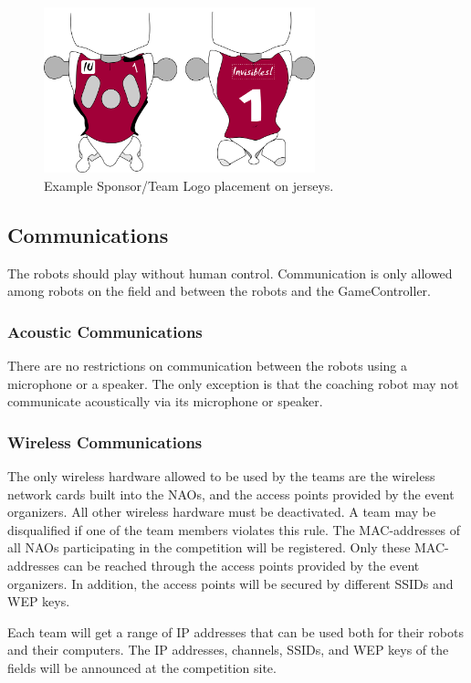 \documentclass[12pt]{article}
\begin{document}
\begin{figure}
\centerline{
\includegraphics[width=0.7\textwidth]{figs/jersey-logo.pdf}}
\caption{Example Sponsor/Team Logo placement on jerseys.}
\label{fig:sponsor_jersey}
\end{figure}


\subsection{Communications}

The robots should play without human control. Communication is only allowed among robots on the field and between the robots and the GameController.

\subsubsection{Acoustic Communications}

There are no restrictions on communication between the robots using a microphone or a speaker.  The only exception is that the coaching robot may not communicate acoustically via its microphone or speaker.

\subsubsection{Wireless Communications}
\label{sec:wireless}
The only wireless hardware allowed to be used by the teams are the wireless network cards built into the NAOs, and the access points provided by the event organizers. All other wireless hardware must be deactivated. A team may be disqualified if one of the team members violates this rule. The MAC-addresses of all NAOs participating in the competition will be registered. Only these MAC-addresses can be reached through the access points provided by the event organizers. In addition, the access points will be secured by different SSIDs and WEP keys. 

Each team will get a range of IP addresses that can be used both for their robots and their computers. The IP addresses, channels, SSIDs, and WEP keys of the fields will be announced at the competition site.
\end{document}
